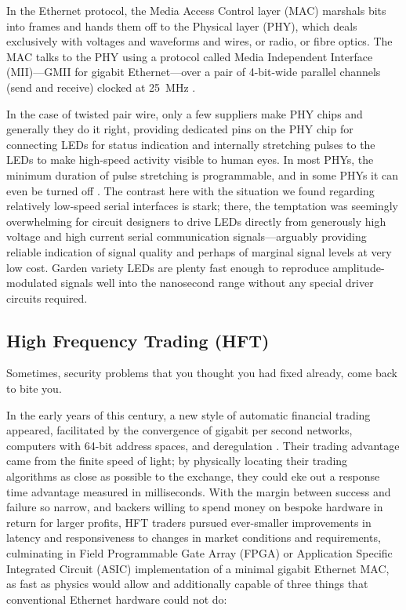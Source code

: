 \documentclass[conference]{IEEEtran}
\begin{document}
In the Ethernet protocol, the Media Access Control layer (MAC) marshals bits
into frames and hands them off to the Physical layer (PHY), which deals
exclusively with voltages and waveforms and wires, or radio, or fibre
optics. The MAC talks to the PHY using a protocol called Media Independent
Interface (MII)---GMII for gigabit Ethernet---over a pair of 4-bit-wide
parallel channels (send and receive) clocked at \SI{25}{\mega\hertz}
\cite{TI2009a}.

In the case of twisted pair wire, only a few suppliers make PHY chips and
generally they do it right, providing dedicated pins on the PHY chip for
connecting LEDs for status indication and internally stretching pulses to the
LEDs to make high-speed activity visible to human eyes. In most PHYs, the
minimum duration of pulse stretching is programmable, and in some PHYs it can
even be turned off \cite[Table 39]{Intel2011a}. The contrast here with the
situation we found regarding relatively low-speed serial interfaces is stark;
there, the temptation was seemingly overwhelming for circuit designers to
drive LEDs directly from generously high voltage and high current serial
communication signals---arguably providing reliable indication of signal
quality and perhaps of marginal signal levels at very low cost. Garden
variety LEDs are plenty fast enough to reproduce amplitude-modulated signals
well into the nanosecond range without any special driver circuits required.

\subsection{High Frequency Trading (HFT)}\label{section:HFT}

Sometimes, security problems that you thought you had fixed already, come
back to bite you.

In the early years of this century, a new style of automatic financial
trading appeared, facilitated by the convergence of gigabit per second
networks, computers with 64-bit address spaces, and deregulation
\cite{Lewis2014a}. Their trading advantage came from the finite speed of
light; by physically locating their trading algorithms as close as possible
to the exchange, they could eke out a response time advantage measured in
milliseconds. With the margin between success and failure so narrow, and
backers willing to spend money on bespoke hardware in return for larger
profits, HFT traders pursued ever-smaller improvements in latency and
responsiveness to changes in market conditions and requirements, culminating
in Field Programmable Gate Array (FPGA) or Application Specific
Integrated Circuit (ASIC) implementation of a minimal gigabit Ethernet MAC,
as fast as physics would allow and additionally capable of three things that
conventional Ethernet hardware could not do:
\end{document}
